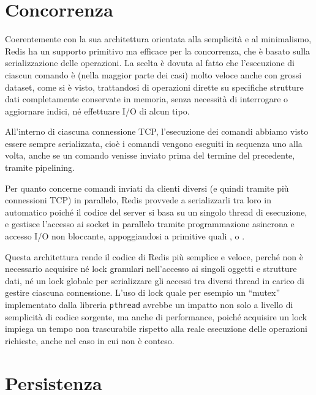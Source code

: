\section{Concorrenza}
\label{sec:concurrency}

Coerentemente con la sua architettura orientata alla semplicità e al minimalismo, Redis ha un
supporto primitivo ma efficace per la concorrenza, che è basato sulla serializzazione delle
operazioni. La scelta è dovuta al fatto che l'esecuzione di ciascun comando è (nella maggior parte
dei casi) molto veloce anche con grossi dataset, come si è visto, trattandosi di operazioni dirette
su specifiche strutture dati completamente conservate in memoria, senza necessità di interrogare o
aggiornare indici, né effettuare I/O di alcun tipo.

All'interno di ciascuna connessione TCP, l'esecuzione dei comandi abbiamo visto essere sempre
serializzata, cioè i comandi vengono eseguiti in sequenza uno alla volta, anche se un comando
venisse inviato prima del termine del precedente, tramite pipelining.

Per quanto concerne comandi inviati da clienti diversi (e quindi tramite più connessioni TCP) in
parallelo, Redis provvede a serializzarli tra loro in automatico poiché il codice del server si
basa su un singolo thread di esecuzione, e gestisce l'accesso ai socket in parallelo tramite
programmazione asincrona e accesso I/O non bloccante, appoggiandosi a primitive quali 
,
 o 
.

Questa architettura rende il codice di Redis più semplice e veloce, perché non è necessario
acquisire né lock granulari nell'accesso ai singoli oggetti e strutture dati, né un lock globale per
serializzare gli accessi tra diversi thread in carico di gestire ciascuna connessione. L'uso di lock
quale per esempio un ``mutex'' implementato dalla libreria \verb|pthread| avrebbe un impatto non
solo a livello di semplicità di codice sorgente, ma anche di performance, poiché acquisire un lock
impiega un tempo non trascurabile rispetto alla reale esecuzione delle operazioni richieste, anche
nel caso in cui non è conteso.

\section{Persistenza}
\label{sec:persistence}

